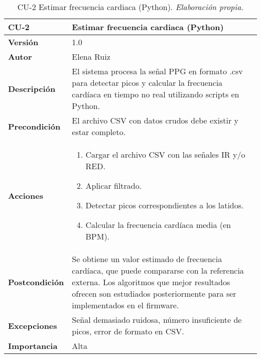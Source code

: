 \begin{table}[H]
	\centering
	\begin{tabularx}{\linewidth}{ p{} p{} }
		\toprule
		\textbf{CU-2}    & \textbf{Estimar frecuencia cardiaca (Python)} \\
		\toprule
		\textbf{Versión}              & 1.0 \\
		\textbf{Autor}                & Elena Ruiz \\
		\textbf{Descripción}          & El sistema procesa la señal PPG en formato .csv para detectar picos y calcular la frecuencia cardíaca en tiempo no real utilizando scripts en Python. \\
		\textbf{Precondición}         & El archivo CSV con datos crudos debe existir y estar completo. \\
		\textbf{Acciones}             &
		\begin{enumerate}
			\item Cargar el archivo CSV con las señales IR y/o RED.
			\item Aplicar filtrado.
			\item Detectar picos correspondientes a los latidos.
			\item Calcular la frecuencia cardíaca media (en BPM).
		\end{enumerate} \\
		\textbf{Postcondición}        & Se obtiene un valor estimado de frecuencia cardíaca, que puede compararse con la referencia externa. Los algoritmos que mejor resultados ofrecen son estudiados posteriormente para ser implementados en el firmware.\\
		\textbf{Excepciones}          & Señal demasiado ruidosa, número insuficiente de picos, error de formato en CSV. \\
		\textbf{Importancia}          & Alta \\
		\bottomrule
	\end{tabularx}
	\caption{CU-2 Estimar frecuencia cardiaca (Python). \textit{Elaboración propia.}}
\end{table}

